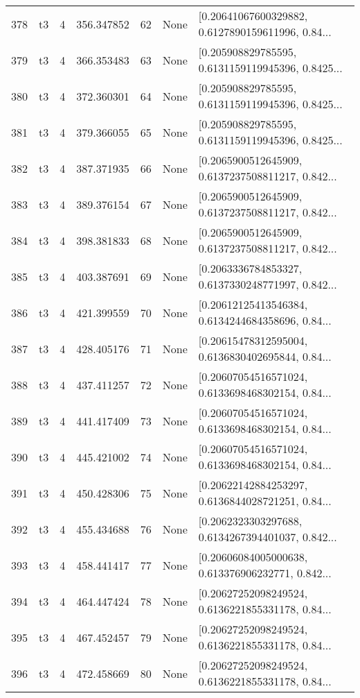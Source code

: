 \begin{tabular}{lllrlll}
378 &  t3 &   4 &  356.347852 &   62 &  None &  [0.20641067600329882, 0.6127890159611996, 0.84... \\
379 &  t3 &   4 &  366.353483 &   63 &  None &  [0.205908829785595, 0.6131159119945396, 0.8425... \\
380 &  t3 &   4 &  372.360301 &   64 &  None &  [0.205908829785595, 0.6131159119945396, 0.8425... \\
381 &  t3 &   4 &  379.366055 &   65 &  None &  [0.205908829785595, 0.6131159119945396, 0.8425... \\
382 &  t3 &   4 &  387.371935 &   66 &  None &  [0.2065900512645909, 0.6137237508811217, 0.842... \\
383 &  t3 &   4 &  389.376154 &   67 &  None &  [0.2065900512645909, 0.6137237508811217, 0.842... \\
384 &  t3 &   4 &  398.381833 &   68 &  None &  [0.2065900512645909, 0.6137237508811217, 0.842... \\
385 &  t3 &   4 &  403.387691 &   69 &  None &  [0.2063336784853327, 0.6137330248771997, 0.842... \\
386 &  t3 &   4 &  421.399559 &   70 &  None &  [0.20612125413546384, 0.6134244684358696, 0.84... \\
387 &  t3 &   4 &  428.405176 &   71 &  None &  [0.20615478312595004, 0.6136830402695844, 0.84... \\
388 &  t3 &   4 &  437.411257 &   72 &  None &  [0.20607054516571024, 0.6133698468302154, 0.84... \\
389 &  t3 &   4 &  441.417409 &   73 &  None &  [0.20607054516571024, 0.6133698468302154, 0.84... \\
390 &  t3 &   4 &  445.421002 &   74 &  None &  [0.20607054516571024, 0.6133698468302154, 0.84... \\
391 &  t3 &   4 &  450.428306 &   75 &  None &  [0.20622142884253297, 0.6136844028721251, 0.84... \\
392 &  t3 &   4 &  455.434688 &   76 &  None &  [0.2062323303297688, 0.6134267394401037, 0.842... \\
393 &  t3 &   4 &  458.441417 &   77 &  None &  [0.20606084005000638, 0.613376906232771, 0.842... \\
394 &  t3 &   4 &  464.447424 &   78 &  None &  [0.20627252098249524, 0.6136221855331178, 0.84... \\
395 &  t3 &   4 &  467.452457 &   79 &  None &  [0.20627252098249524, 0.6136221855331178, 0.84... \\
396 &  t3 &   4 &  472.458669 &   80 &  None &  [0.20627252098249524, 0.6136221855331178, 0.84... \\

\end{tabular}
